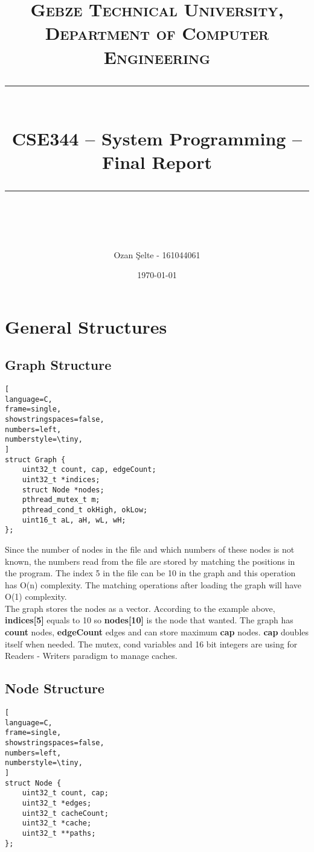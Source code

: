 \documentclass[11pt]{scrartcl} %
\title{	
	\normalfont\normalsize
	\textsc{Gebze Technical University, Department of Computer Engineering}\\ %
	\vspace{25pt} %
	\rule{\linewidth}{0.5pt}\\ %
	\vspace{20pt} %
	{\huge CSE344 – System Programming – Final Report}\\ %
	\vspace{12pt} %
	\rule{\linewidth}{2pt}\\ %
	\vspace{12pt} %
}
\author{\LARGE Ozan Şelte - 161044061} %
\date{\normalsize\today} %
\begin{document}
\maketitle %


\section{General Structures}

\subsection{Graph Structure}

\begin{lstlisting}[
language=C,
frame=single,
showstringspaces=false,
numbers=left,
numberstyle=\tiny,
]
struct Graph {
	uint32_t count, cap, edgeCount;
	uint32_t *indices;
	struct Node *nodes;
	pthread_mutex_t m;
	pthread_cond_t okHigh, okLow;
	uint16_t aL, aH, wL, wH;
};
\end{lstlisting}

Since the number of nodes in the file and which numbers of these nodes is not known, the numbers read from the file are stored by matching the positions in the program. The index 5 in the file can be 10 in the graph and this operation has O(n) complexity. The matching operations after loading the graph will have O(1) complexity. \\

The graph stores the nodes as a vector. According to the example above, \textbf{indices[5]} equals to 10 so \textbf{nodes[10]} is the node that wanted. The graph has \textbf{count} nodes, \textbf{edgeCount} edges and can store maximum \textbf{cap} nodes. \textbf{cap} doubles itself when needed. The mutex, cond variables and 16 bit integers are using for Readers - Writers paradigm to manage caches.

\subsection{Node Structure}

\begin{lstlisting}[
language=C,
frame=single,
showstringspaces=false,
numbers=left,
numberstyle=\tiny,
]
struct Node {
    uint32_t count, cap;
    uint32_t *edges;
    uint32_t cacheCount;
    uint32_t *cache;
    uint32_t **paths;
};
\end{lstlisting}
\end{document}
